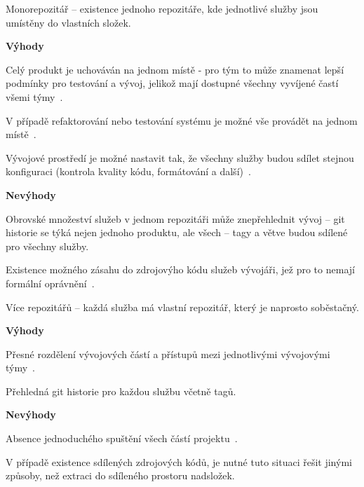 \begin{dl}
   \item[Monorepozitář] – existence jednoho repozitáře, kde jednotlivé služby jsou umístěny do vlastních složek.

   \textbf{Výhody}
   \begin{ul}
      \item Celý produkt je uchováván na jednom místě - pro tým to může znamenat lepší podmínky pro testování a vývoj, jelikož mají dostupné všechny vyvíjené častí všemi týmy~\cite{monomulti}.
      \item V případě refaktorování nebo testování systému je možné vše provádět na jednom místě~\cite{monomulti}.
      \item Vývojové prostředí je možné nastavit tak, že všechny služby budou sdílet stejnou konfiguraci (kontrola kvality kódu, formátování a další)~\cite{monomulti}.
   \end{ul}

   \textbf{Nevýhody}
   \begin{ul}
      \item Obrovské množeství služeb v jednom repozitáři může znepřehlednit vývoj – git historie se týká nejen jednoho produktu, ale všech – tagy a větve budou sdílené pro všechny služby.
      \item Existence možného zásahu do zdrojovýho kódu služeb vývojáři, jež pro to nemají formální oprávnění~\cite{monomulti}.
   \end{ul}

   \item[Více repozitářů] – každá služba má vlastní repozitář, který je naprosto soběstačný.

   \textbf{Výhody}
   \begin{ul}
      \item Přesné rozdělení vývojových částí a přístupů mezi jednotlivými vývojovými týmy~\cite{monomulti}.
      \item Přehledná git historie pro každou službu včetně tagů.
   \end{ul}

   \textbf{Nevýhody}
   \begin{ul}
      \item Absence jednoduchého spuštění všech částí projektu~\cite{monomulti}.
      \item V případě existence sdílených zdrojových kódů, je nutné tuto situaci řešit jinými způsoby, než extraci do sdíleného prostoru nadsložek.
   \end{ul}
\end{dl}


